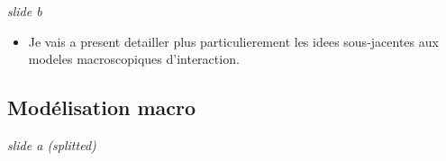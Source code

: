 \documentclass[12pt]{article}
\begin{document}
\textit{slide b}

\begin{itemize}
	\item Je vais a present detailler plus particulierement les idees sous-jacentes aux modeles macroscopiques d'interaction.
\end{itemize}


\newpage



\subsection*{Modélisation macro}



\textit{slide a (splitted)}
\end{document}
